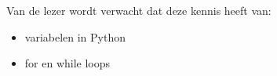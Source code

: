 Van de lezer wordt verwacht dat deze kennis heeft van:
\begin{itemize}
\item variabelen in Python
\item for en while loops
\end{itemize}
